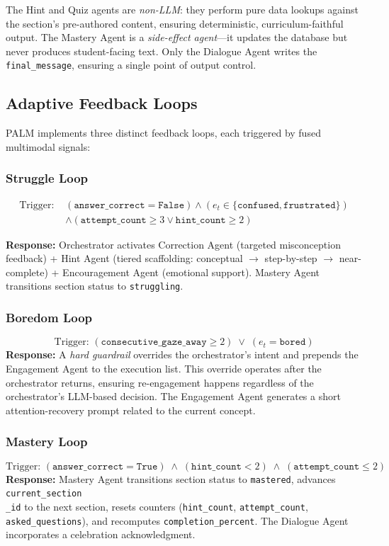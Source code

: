 \documentclass[conference, letterpaper]{IEEEtran}
\begin{document}
The Hint and Quiz agents are \emph{non-LLM}: they perform pure data lookups against the section's pre-authored content, ensuring deterministic, curriculum-faithful output. The Mastery Agent is a \emph{side-effect agent}---it updates the database but never produces student-facing text. Only the Dialogue Agent writes the \texttt{final\_message}, ensuring a single point of output control.

\subsection{Adaptive Feedback Loops}

PALM implements three distinct feedback loops, each triggered by fused multimodal signals:

\subsubsection{Struggle Loop}
\[
\begin{aligned}
\text{Trigger: } & (\texttt{answer\_correct} = \texttt{False})
\wedge (e_t \in \{\texttt{confused}, \texttt{frustrated}\}) \\
& \wedge (\texttt{attempt\_count} \geq 3 \vee \texttt{hint\_count} \geq 2)
\end{aligned}
\]


\textbf{Response:} Orchestrator activates Correction Agent (targeted misconception feedback) + Hint Agent (tiered scaffolding: conceptual $\rightarrow$ step-by-step $\rightarrow$ near-complete) + Encouragement Agent (emotional support). Mastery Agent transitions section status to \texttt{struggling}.

\subsubsection{Boredom Loop}
\[
\text{Trigger: } (\texttt{consecutive\_gaze\_away} \geq 2) \;\vee\; (e_t = \texttt{bored})
\]
\textbf{Response:} A \emph{hard guardrail} overrides the orchestrator's intent and prepends the Engagement Agent to the execution list. This override operates after the orchestrator returns, ensuring re-engagement happens regardless of the orchestrator's LLM-based decision. The Engagement Agent generates a short attention-recovery prompt related to the current concept.

\subsubsection{Mastery Loop}
\[
\text{Trigger: } (\texttt{answer\_correct} = \texttt{True}) \;\wedge\; (\texttt{hint\_count} < 2) \;\wedge\; (\texttt{attempt\_count} \leq 2)
\]
\textbf{Response:} Mastery Agent transitions section status to \texttt{mastered}, advances \texttt{current\_section \\ \_id} to the next section, resets counters (\texttt{hint\_count}, \texttt{attempt\_count}, \texttt{asked\_questions}), and recomputes \texttt{completion\_percent}. The Dialogue Agent incorporates a celebration acknowledgment.
\end{document}
